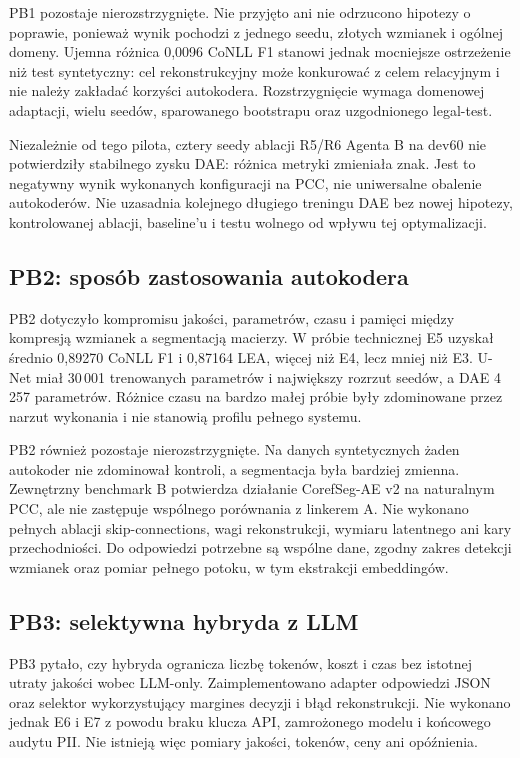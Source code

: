 PB1 pozostaje nierozstrzygnięte. Nie przyjęto ani nie odrzucono hipotezy o poprawie, ponieważ wynik pochodzi z jednego seedu, złotych wzmianek i ogólnej domeny. Ujemna różnica 0,0096 CoNLL F1 stanowi jednak mocniejsze ostrzeżenie niż test syntetyczny: cel rekonstrukcyjny może konkurować z celem relacyjnym i nie należy zakładać korzyści autokodera. Rozstrzygnięcie wymaga domenowej adaptacji, wielu seedów, sparowanego bootstrapu oraz uzgodnionego legal-test.

Niezależnie od tego pilota, cztery seedy ablacji R5/R6 Agenta B na dev60 nie potwierdziły stabilnego zysku DAE: różnica metryki zmieniała znak. Jest to negatywny wynik wykonanych konfiguracji na PCC, nie uniwersalne obalenie autokoderów. Nie uzasadnia kolejnego długiego treningu DAE bez nowej hipotezy, kontrolowanej ablacji, baseline'u i testu wolnego od wpływu tej optymalizacji.

\subsection{PB2: sposób zastosowania autokodera}

PB2 dotyczyło kompromisu jakości, parametrów, czasu i pamięci między kompresją wzmianek a segmentacją macierzy. W próbie technicznej E5 uzyskał średnio 0,89270 CoNLL F1 i 0,87164 LEA, więcej niż E4, lecz mniej niż E3. U-Net miał 30\,001 trenowanych parametrów i największy rozrzut seedów, a DAE 4\,257 parametrów. Różnice czasu na bardzo małej próbie były zdominowane przez narzut wykonania i nie stanowią profilu pełnego systemu.

PB2 również pozostaje nierozstrzygnięte. Na danych syntetycznych żaden autokoder nie zdominował kontroli, a segmentacja była bardziej zmienna. Zewnętrzny benchmark B potwierdza działanie CorefSeg-AE v2 na naturalnym PCC, ale nie zastępuje wspólnego porównania z linkerem A. Nie wykonano pełnych ablacji skip-connections, wagi rekonstrukcji, wymiaru latentnego ani kary przechodniości. Do odpowiedzi potrzebne są wspólne dane, zgodny zakres detekcji wzmianek oraz pomiar pełnego potoku, w tym ekstrakcji embeddingów.

\subsection{PB3: selektywna hybryda z LLM}

PB3 pytało, czy hybryda ogranicza liczbę tokenów, koszt i czas bez istotnej utraty jakości wobec LLM-only. Zaimplementowano adapter odpowiedzi JSON oraz selektor wykorzystujący margines decyzji i błąd rekonstrukcji. Nie wykonano jednak E6 i E7 z powodu braku klucza API, zamrożonego modelu i końcowego audytu PII. Nie istnieją więc pomiary jakości, tokenów, ceny ani opóźnienia.

